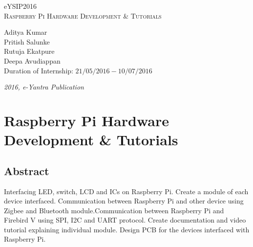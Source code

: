 \documentclass[a4paper,12pt,oneside]{book}
\begin{document}
\begin{titlepage}
\raggedright
{\Large eYSIP2016\\[1cm]}
{\Huge\scshape Raspberry Pi Hardware Development \& Tutorials \\[.1in]}
\vfill
\begin{flushright}
{\large Aditya Kumar \\}
{\large Pritish Salunke \\}
{\large Rutuja Ekatpure \\}
{\large Deepa Avudiappan \\}
{\large Duration of Internship: $ 21/05/2016-10/07/2016 $ \\}
\end{flushright}

{\itshape 2016, e-Yantra Publication}
\end{titlepage}

\chapter[Project Tag]{Raspberry Pi Hardware Development \& Tutorials}
\section*{Abstract}
Interfacing LED, switch, LCD and ICs on Raspberry Pi. Create a module of each device interfaced. Communication between Raspberry Pi and other device using Zigbee and Bluetooth module.Communication between Raspberry Pi and Firebird V using SPI, I2C and UART protocol. Create documentation and video tutorial explaining individual module. Design PCB for the devices interfaced with Raspberry Pi.
\end{document}
